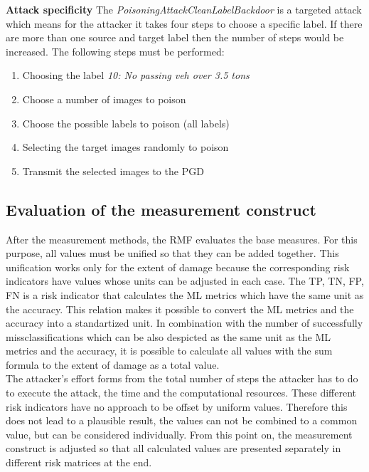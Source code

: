 \noindent\textbf{Attack specificity} The \textit{PoisoningAttackCleanLabelBackdoor} is a targeted attack which means for the attacker it takes four steps to choose a specific label. If there are more than one source and target label then the number of steps would be increased. The following steps must be performed:

\begin{enumerate}
  \item Choosing the label \textit{10: No passing veh over 3.5 tons}
  \item Choose a number of images to poison
  \item Choose the possible labels to poison (all labels)
  \item Selecting the target images randomly to poison
  \item Transmit the selected images to the PGD
\end{enumerate}

\subsection{Evaluation of the measurement construct}

After the measurement methods, the RMF evaluates the base measures. For this purpose, all values must be unified so that they can be added together. This unification works only for the extent of damage because the corresponding risk indicators have values whose units can be adjusted in each case. The TP, TN, FP, FN is a risk indicator that calculates the ML metrics which have the same unit as the accuracy. This relation makes it possible to convert the ML metrics and the accuracy into a standartized unit. In combination with the number of successfully missclassifications which can be also despicted as the same unit as the ML metrics and the accuracy, it is possible to calculate all values with the sum formula to the extent of damage as a total value. \\
The attacker's effort forms from the total number of steps the attacker has to do to execute the attack, the time and the computational resources. These different risk indicators have no approach to be offset by uniform values. Therefore this does not lead to a plausible result, the values can not be combined to a common value, but can be considered individually. From this point on, the measurement construct is adjusted so that all calculated values are presented separately in different risk matrices at the end.


